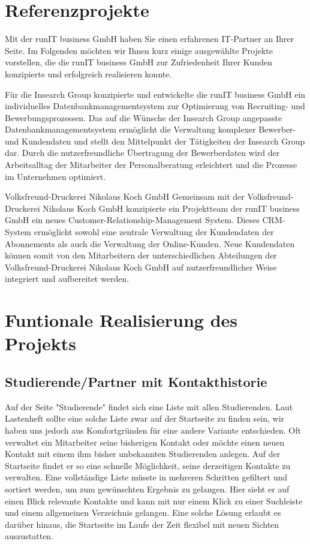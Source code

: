 \documentclass[10pt,a4paper]{article}
\begin{document}
\section{Referenzprojekte}
Mit der runIT business GmbH haben Sie einen erfahrenen IT-Partner an Ihrer Seite. Im Folgenden möchten wir Ihnen kurz einige ausgewählte Projekte vorstellen, die die runIT business GmbH zur Zufriedenheit Ihrer Kunden konzipierte und erfolgreich realisieren konnte.

 
Für die Insearch Group konzipierte und entwickelte die runIT business GmbH ein individuelles Datenbankmanagementsystem zur Optimierung von Recruiting- und Bewerbungsprozessen. Das auf die Wünsche der Insearch Group angepasste Datenbankmanagementsystem ermöglicht die Verwaltung komplexer Bewerber- und Kundendaten und stellt den Mittelpunkt der Tätigkeiten der Insearch Group dar. Durch die nutzerfreundliche Übertragung der Bewerberdaten wird der Arbeitsalltag der Mitarbeiter der Personalberatung erleichtert und die Prozesse im Unternehmen optimiert.

Volksfreund-Druckerei Nikolaus Koch GmbH
Gemeinsam mit der Volksfreund-Druckerei Nikolaus Koch GmbH konzipierte ein Projektteam der runIT business GmbH ein neues Customer-Relationship-Management System. Dieses CRM-System ermöglicht sowohl eine zentrale Verwaltung der Kundendaten der Abonnements als auch die Verwaltung der Online-Kunden. Neue Kundendaten können somit von den Mitarbeitern der unterschiedlichen Abteilungen der Volksfreund-Druckerei Nikolaus Koch GmbH auf nutzerfreundlicher Weise integriert und aufbereitet werden.

\section{Funtionale Realisierung des Projekts}
\subsection{Studierende/Partner mit Kontakthistorie}
Auf der Seite "Studierende" findet sich eine Liste mit allen Studierenden. Laut Lastenheft sollte eine solche Liste zwar auf der Startseite zu finden sein, wir haben uns jedoch aus Komfortgründen für eine andere Variante entschieden. Oft verwaltet ein Mitarbeiter seine bisherigen Kontakt oder möchte einen neuen Kontakt mit einem ihm bisher unbekannten Studierenden anlegen. Auf der Startseite findet er so eine schnelle Möglichkeit, seine derzeitigen Kontakte zu verwalten. Eine vollständige Liste müsste in mehreren Schritten gefiltert und sortiert werden, um zum gewünschten Ergebnis zu gelangen. Hier sieht er auf einen Blick relevante Kontakte und kann mit nur einem Klick zu einer Suchleiste und einem allgemeinen Verzeichnis gelangen. Eine solche Lösung erlaubt es darüber hinaus, die Startseite im Laufe der Zeit flexibel mit neuen Sichten auszustatten.
\end{document}
